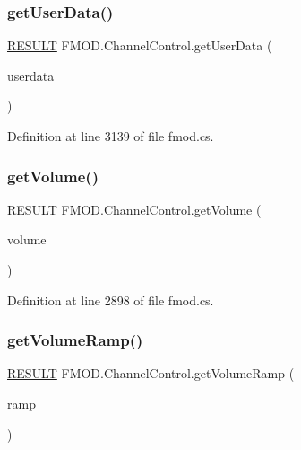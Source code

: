 \subsubsection{\texorpdfstring{get\+User\+Data()}{getUserData()}}
{\footnotesize\ttfamily \hyperlink{namespace_f_m_o_d_a305d1176ef3f8c8815861a60407ac33d}{R\+E\+S\+U\+LT} F\+M\+O\+D.\+Channel\+Control.\+get\+User\+Data (\begin{DoxyParamCaption}\item[{out Int\+Ptr}]{userdata }\end{DoxyParamCaption})}



Definition at line 3139 of file fmod.\+cs.

\mbox{\label{class_f_m_o_d_1_1_channel_control_af5dc7eb6b7ba0d8eba0365dccc905dc0}} 
\subsubsection{\texorpdfstring{get\+Volume()}{getVolume()}}
{\footnotesize\ttfamily \hyperlink{namespace_f_m_o_d_a305d1176ef3f8c8815861a60407ac33d}{R\+E\+S\+U\+LT} F\+M\+O\+D.\+Channel\+Control.\+get\+Volume (\begin{DoxyParamCaption}\item[{out float}]{volume }\end{DoxyParamCaption})}



Definition at line 2898 of file fmod.\+cs.

\mbox{\label{class_f_m_o_d_1_1_channel_control_a41128cb5b81af5f232ba29abaa6a71d5}} 
\subsubsection{\texorpdfstring{get\+Volume\+Ramp()}{getVolumeRamp()}}
{\footnotesize\ttfamily \hyperlink{namespace_f_m_o_d_a305d1176ef3f8c8815861a60407ac33d}{R\+E\+S\+U\+LT} F\+M\+O\+D.\+Channel\+Control.\+get\+Volume\+Ramp (\begin{DoxyParamCaption}\item[{out bool}]{ramp }\end{DoxyParamCaption})}



